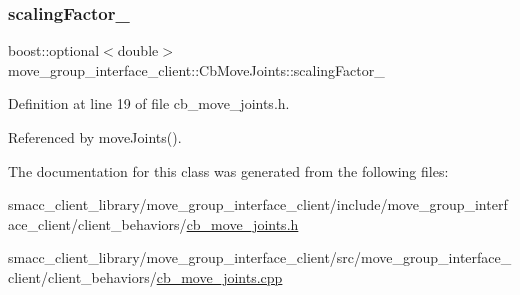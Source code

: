 \subsubsection{\texorpdfstring{scaling\+Factor\+\_\+}{scalingFactor\_}}
{\footnotesize\ttfamily boost\+::optional$<$double$>$ move\+\_\+group\+\_\+interface\+\_\+client\+::\+Cb\+Move\+Joints\+::scaling\+Factor\+\_\+}



Definition at line 19 of file cb\+\_\+move\+\_\+joints.\+h.



Referenced by move\+Joints().



The documentation for this class was generated from the following files\+:\begin{DoxyCompactItemize}
\item 
smacc\+\_\+client\+\_\+library/move\+\_\+group\+\_\+interface\+\_\+client/include/move\+\_\+group\+\_\+interface\+\_\+client/client\+\_\+behaviors/\hyperlink{cb__move__joints_8h}{cb\+\_\+move\+\_\+joints.\+h}\item 
smacc\+\_\+client\+\_\+library/move\+\_\+group\+\_\+interface\+\_\+client/src/move\+\_\+group\+\_\+interface\+\_\+client/client\+\_\+behaviors/\hyperlink{cb__move__joints_8cpp}{cb\+\_\+move\+\_\+joints.\+cpp}\end{DoxyCompactItemize}
